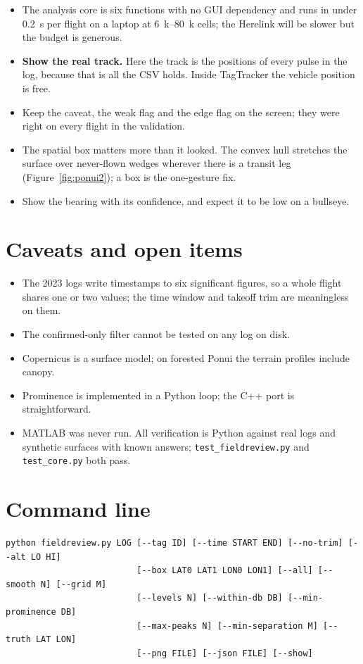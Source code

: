 \documentclass[11pt,a4paper]{article}
\newcommand{\code}[1]{\texttt{\small #1}}
\begin{document}
\begin{itemize}
\item The analysis core is six functions with no GUI dependency and runs in under
\SI{0.2}{s} per flight on a laptop at \SIrange{6}{80}{k} cells; the Herelink will be slower
but the budget is generous.
\item \textbf{Show the real track.} Here the track is the positions of every pulse in the
log, because that is all the CSV holds. Inside TagTracker the vehicle position is free.
\item Keep the caveat, the weak flag and the edge flag on the screen; they were right on
every flight in the validation.
\item The spatial box matters more than it looked. The convex hull stretches the surface over
never-flown wedges wherever there is a transit leg (Figure~\ref{fig:ponui2}); a box is the
one-gesture fix.
\item Show the bearing with its confidence, and expect it to be low on a bullseye.
\end{itemize}

\section{Caveats and open items}

\begin{itemize}
\item The 2023 logs write timestamps to six significant figures, so a whole flight shares one
or two values; the time window and takeoff trim are meaningless on them.
\item The confirmed-only filter cannot be tested on any log on disk.
\item Copernicus is a surface model; on forested Ponui the terrain profiles include canopy.
\item Prominence is implemented in a Python loop; the C++ port is straightforward.
\item MATLAB was never run. All verification is Python against real logs and synthetic
surfaces with known answers; \code{test\_fieldreview.py} and \code{test\_core.py} both pass.
\end{itemize}

\appendix
\section{Command line}

\begin{lstlisting}
python fieldreview.py LOG [--tag ID] [--time START END] [--no-trim] [--alt LO HI]
                          [--box LAT0 LAT1 LON0 LON1] [--all] [--smooth N] [--grid M]
                          [--levels N] [--within-db DB] [--min-prominence DB]
                          [--max-peaks N] [--min-separation M] [--truth LAT LON]
                          [--png FILE] [--json FILE] [--show]
\end{lstlisting}
\end{document}
